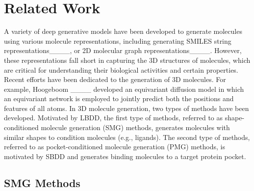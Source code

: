 \section{Related Work}

A variety of deep generative models have been developed to generate molecules using various molecule representations, 
including generating SMILES string representations____, or 2D molecular graph representations____.
%
{However, these representations fall short in capturing the 3D structures of molecules, which are critical for understanding their biological activities and certain properties.}
%
Recent efforts have been dedicated to the generation of 3D molecules. 
%
For example, Hoogeboom \etal____ developed an equivariant diffusion model 
in which an equivariant network is employed to
jointly predict both the positions and features of all atoms.
%
In 3D molecule generation, two types of methods have been developed.
%
Motivated by LBDD, the first type of methods, referred to as shape-conditioned molecule generation (SMG) methods, generates molecules with similar shapes to condition molecules (e.g., ligands).
% 
The second type of methods, referred to as pocket-conditioned molecule generation (PMG) methods, is motivated by SBDD and generates binding molecules to a target protein pocket.
%



\subsection*{SMG Methods}

